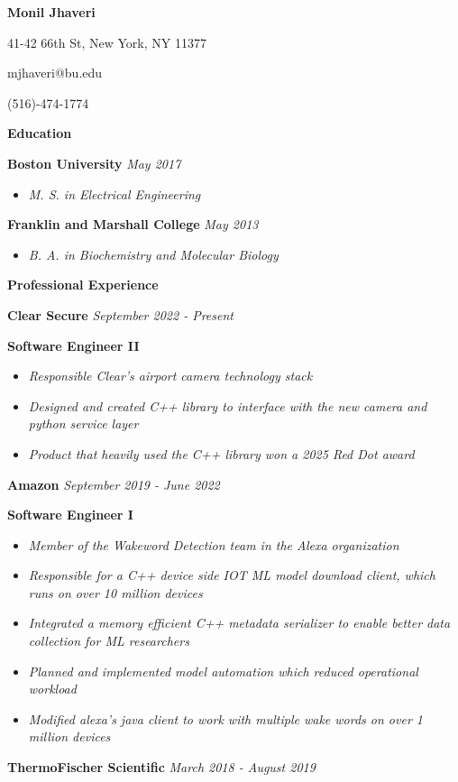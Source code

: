 \documentclass[8pt]{extarticle}
\begin{document}
\begin{center} 
\large \textbf{Monil Jhaveri}


41-42 66th St, New York, NY 11377

mjhaveri@bu.edu 

(516)-474-1774 
\end{center} 
\begin{changemargin}{-0.8cm}{0.0cm}
\textbf{Education}
\end{changemargin}
\vspace*{-0.4cm}
\makebox[\linewidth]{\rule{17cm}{0.4pt}}
\textbf{Boston University} \textit{May 2017}
\begin{itemize}
\item \textit{M. S. in Electrical Engineering}
\end{itemize}
\textbf{Franklin and Marshall College} \textit{May 2013}
\begin{itemize}
\item \textit{B. A. in Biochemistry and Molecular Biology }

\end{itemize}
\begin{changemargin}{-0.8cm}{0.0cm}
	\textbf{Professional Experience}
\end{changemargin}
\vspace*{-0.4cm}
\makebox[\linewidth]{\rule{17cm}{0.4pt}}
\textbf{Clear Secure} \hfill\textit{September 2022 - Present}

{\tiny }
\textbf{Software Engineer II}
\begin{itemize}
	\item \textit{Responsible Clear's airport camera technology stack}
	\item \textit{Designed and created C++ library to interface with the new camera and python service layer}
	\item \textit{Product that heavily used the C++ library won a 2025 Red Dot award}
\end{itemize}
\textbf{Amazon} \hfill\textit{September 2019 - June 2022}

{\tiny }
\textbf{Software Engineer I}
\begin{itemize}
	\item \textit{Member of the Wakeword Detection team in the Alexa organization}
	\item \textit{Responsible for a C++ device side IOT ML model download client, which runs on over 10 million devices}
	\item \textit{Integrated a memory efficient C++ metadata serializer to enable better data collection for ML researchers}
	\item \textit{Planned and implemented model automation which reduced operational workload}	\item \textit{Modified alexa's  java client to work with multiple wake words on over 1 million devices}
\end{itemize}
\textbf{ThermoFischer Scientific} \hfill\textit{March 2018 - August 2019}
\end{document}
